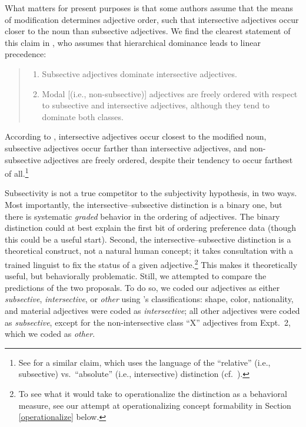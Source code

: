\documentclass[12pt]{article}
\newcommand{\ben}{\begin{enumerate}}
\newcommand{\een}{\end{enumerate}}
\begin{document}
What matters for present purposes is that some authors assume that the means of modification determines adjective order, such that intersective adjectives occur closer to the noun than subsective adjectives. We find the clearest statement of this claim in \cite{truswell2009}, who assumes that hierarchical dominance leads to linear precedence:

\begin{quotation}
\noindent\ben
	\item Subsective adjectives dominate intersective adjectives. \item Modal [(i.e., non-subsective)] adjectives are freely ordered with respect to subsective and intersective adjectives, although they tend to dominate both classes.
	\een
\end{quotation}

\noindent According to \citeauthor{truswell2009}, intersective adjectives occur closest to the modified noun, subsective adjectives occur farther than intersective adjectives, and non-subsective adjectives are freely ordered, despite their tendency to occur farthest of all.\footnote{See \citet{Sproat1991} for a similar claim, which uses the language of the ``relative'' (i.e., subsective) vs.~``absolute'' (i.e., intersective) distinction (cf.~\citealp{siegel1976}).} 

Subsectivity is not a true competitor to the subjectivity hypothesis, in two ways. 
Most importantly, the intersective--subsective distinction is a binary one, but there is systematic \emph{graded} behavior in the ordering of adjectives. The binary distinction could at best explain the first bit of ordering preference data (though this could be a useful start).
Second, the intersective--subsective distinction is a theoretical construct, not a natural human concept; it takes consultation with a trained linguist to fix the status of a given adjective.\footnote{To see what it would take to operationalize the distinction as a behavioral measure, see our attempt at operationalizing concept formability in Section \ref{operationalize} below.} This makes it theoretically useful, but behaviorally problematic.
Still, we attempted to compare the predictions of the two proposals. To do so, we coded our adjectives as either \emph{subsective}, \emph{intersective}, or \emph{other} using \citeauthor{truswell2009}'s classifications: shape, color, nationality, and material adjectives were coded as \emph{intersective}; all other adjectives were coded as \emph{subsective}, except for the non-intersective class ``X'' adjectives from Expt.~2, which we coded as \emph{other}.
\end{document}
